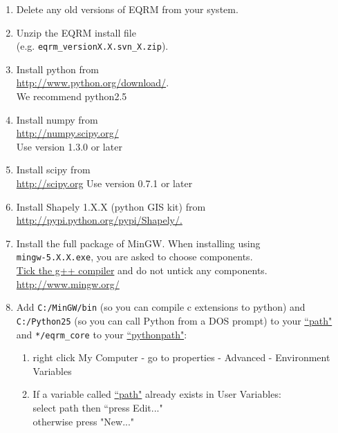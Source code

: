 \documentclass[a4paper, 12pt]{article}
\begin{document}
\begin{enumerate}

\item Delete any old versions of EQRM from your system. \\

\item Unzip the EQRM install file \\
(e.g. \texttt{eqrm\_versionX.X.svn\_X.zip}). \\

\item Install python from \\
\url{http://www.python.org/download/}. \\
We recommend python2.5

\item Install numpy from \\
  \url{http://numpy.scipy.org/} \\
  Use version 1.3.0 or later \\

\item Install scipy from \\
 \url{http://scipy.org}
 Use version 0.7.1 or later \\

\item Install Shapely 1.X.X (python GIS kit) from \\
\url{http://pypi.python.org/pypi/Shapely/.}

\item Install the full package of MinGW.
When installing using \\
\texttt{mingw-5.X.X.exe}, you are
asked to choose components.  \\
\underline{Tick the g++ compiler} and do not untick any components. \\
 \url{http://www.mingw.org/}
\item Add \texttt{C:/MinGW/bin} (so you can compile c extensions
to python) and \texttt{C:/Python25} (so you can call Python from a
DOS prompt) to your \underline{``path"} and \texttt{*/eqrm\_core} to
your \underline{``pythonpath"}:
\begin{enumerate}

\item right click My Computer - go to properties - Advanced - Environment Variables

\item If a variable called \underline{``path"} already exists in User
Variables: \\
select path then ``press Edit..." \\
otherwise press "New..." \\


\end{enumerate}
\end{enumerate}
\end{document}
